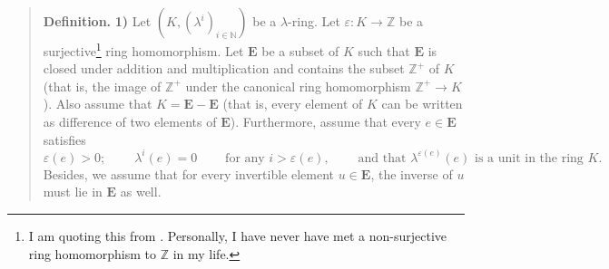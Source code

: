 \documentclass[numbers=enddot,12pt,final,onecolumn,notitlepage]{scrartcl}%
\begin{document}
\begin{quote}
\textbf{Definition.} \textbf{1)} Let $\left(  K,\left(  \lambda^{i}\right)
_{i\in\mathbb{N}}\right)  $ be a $\lambda$-ring. Let $\varepsilon
:K\rightarrow\mathbb{Z}$ be a surjective\footnote{I am quoting this from
\cite{FulLan85}. Personally, I have never have met a non-surjective ring
homomorphism to $\mathbb{Z}$ in my life.} ring homomorphism. Let $\mathbf{E}$
be a subset of $K$ such that $\mathbf{E}$ is closed under addition and
multiplication and contains the subset $\mathbb{Z}^{+}$ of $K$ (that is, the
image of $\mathbb{Z}^{+}$ under the canonical ring homomorphism $\mathbb{Z}%
^{+}\rightarrow K$). Also assume that $K=\mathbf{E}-\mathbf{E}$ (that is,
every element of $K$ can be written as difference of two elements of
$\mathbf{E}$). Furthermore, assume that every $e\in\mathbf{E}$ satisfies%
\[
\varepsilon\left(  e\right)  >0;\ \ \ \ \ \ \ \ \ \ \lambda^{i}\left(
e\right)  =0\ \ \ \ \ \ \ \ \ \ \text{for any }i>\varepsilon\left(  e\right)
,\ \ \ \ \ \ \ \ \ \ \text{and that }\lambda^{\varepsilon\left(  e\right)
}\left(  e\right)  \text{ is a unit in the ring }K.
\]
Besides, we assume that for every invertible element $u\in\mathbf{E}$, the
inverse of $u$ must lie in $\mathbf{E}$ as well.


\end{quote}
\end{document}
